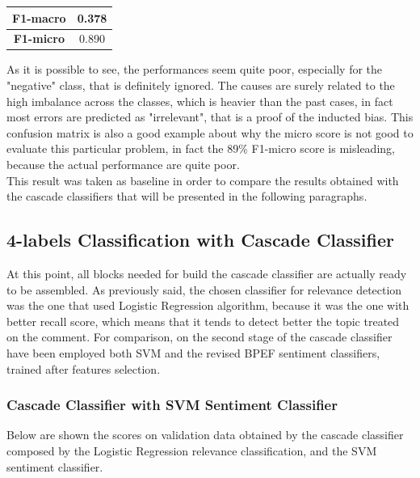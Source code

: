 \begin{center}
	\begin{tabular}{ | c | c | } 
		\hline
		\textbf{F1-macro} & 0.378 \\
		\hline
		\textbf{F1-micro} & 0.890 \\ 
		\hline
	\end{tabular}
\end{center}

As it is possible to see, the performances seem quite poor, especially for the "negative" class, that is definitely ignored. The causes are surely related to the high imbalance across the classes, which is heavier than the past cases, in fact most errors are predicted as "irrelevant", that is a proof of the inducted bias. This confusion matrix is also a good example about why the micro score is not good to evaluate this particular problem, in fact the 89\% F1-micro score is misleading, because the actual performance are quite poor. \\
This result was taken as baseline in order to compare the results obtained with the cascade classifiers that will be presented in the following paragraphs.


\subsection{4-labels Classification with Cascade Classifier}

At this point, all blocks needed for build the cascade classifier are actually ready to be assembled. As previously said, the chosen classifier for relevance detection was the one that used Logistic Regression algorithm, because it was the one with better recall score, which means that it tends to detect better the topic treated on the comment. For comparison, on the second stage of the cascade classifier have been employed both SVM and the revised BPEF sentiment classifiers, trained after features selection.

\subsubsection{Cascade Classifier with SVM Sentiment Classifier}

Below are shown the scores on validation data obtained by the cascade classifier composed by the Logistic Regression relevance classification, and the SVM sentiment classifier.

